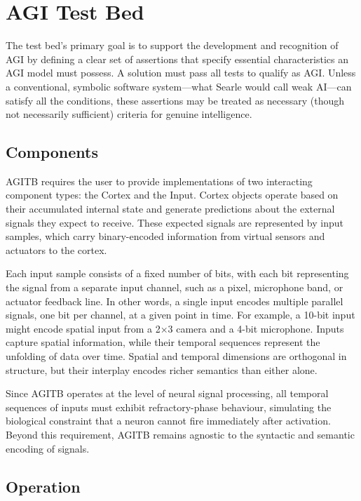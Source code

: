 \documentclass{article}
\begin{document}
\section{AGI Test Bed}

The test bed's primary goal is to support the development and recognition of AGI by defining a clear set of assertions that specify essential characteristics an AGI model must possess. A solution must pass all tests to qualify as AGI. Unless a conventional, symbolic software system—what Searle \cite{Searle1980} would call weak AI—can satisfy all the conditions, these assertions may be treated as necessary (though not necessarily sufficient) criteria for genuine intelligence.

\subsection{Components}
AGITB requires the user to provide implementations of two interacting component types: the Cortex and the Input. Cortex objects operate based on their accumulated internal state and generate predictions about the external signals they expect to receive. These expected signals are represented by input samples, which carry binary-encoded information from virtual sensors and actuators to the cortex.

Each input sample consists of a fixed number of bits, with each bit representing the signal from a separate input channel, such as a pixel, microphone band, or actuator feedback line. In other words, a single input encodes multiple parallel signals, one bit per channel, at a given point in time. For example, a 10-bit input might encode spatial input from a 2×3 camera and a 4-bit microphone. Inputs capture spatial information, while their temporal sequences represent the unfolding of data over time. Spatial and temporal dimensions are orthogonal in structure, but their interplay encodes richer semantics than either alone. 

Since AGITB operates at the level of neural signal processing, all temporal sequences of inputs must exhibit refractory-phase behaviour, simulating the biological constraint that a neuron cannot fire immediately after activation. Beyond this requirement, AGITB remains agnostic to the syntactic and semantic encoding of signals. 

\subsection{Operation}
\end{document}
